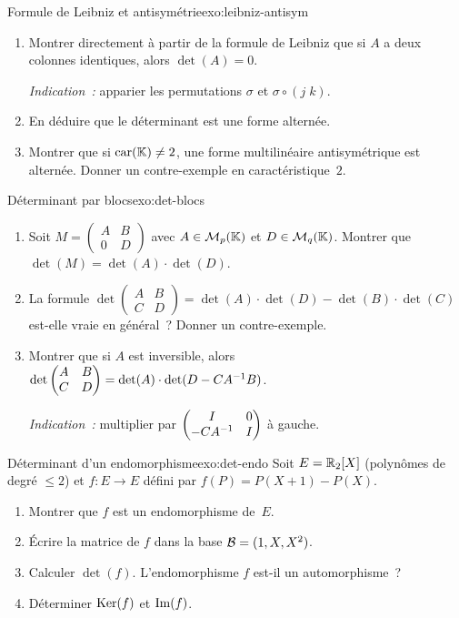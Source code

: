 \begin{exercise}{\challenging{} Formule de Leibniz et antisymétrie}{exo:leibniz-antisym}
  \begin{enumerate}[label=(\alph*)]
    \item Montrer directement à partir de la formule de Leibniz que si
      $A$ a deux colonnes identiques, alors $\det(A)=0$.

      \emph{Indication~:} apparier les permutations $\sigma$ et
      $\sigma\circ(j\;k)$.
    \item En déduire que le déterminant est une forme alternée.
    \item Montrer que si $\operatorname{car}({\mathbb{K}})\neq 2$, une forme multilinéaire
      antisymétrique est alternée. Donner un contre-exemple en
      caractéristique~$2$.
  \end{enumerate}
\end{exercise}

\begin{exercise}{\challenging{} Déterminant par blocs}{exo:det-blocs}
  \begin{enumerate}[label=(\alph*)]
    \item Soit $M=\begin{pmatrix}A&B\\0&D\end{pmatrix}$ avec
      $A\in\mathcal{M}_p({\mathbb{K}})$ et $D\in\mathcal{M}_q({\mathbb{K}})$. Montrer que
      $\det(M)=\det(A)\cdot\det(D)$.
    \item La formule $\det\begin{pmatrix}A&B\\C&D\end{pmatrix}
      =\det(A)\cdot\det(D)-\det(B)\cdot\det(C)$ est-elle vraie en
      général~? Donner un contre-exemple.
    \item Montrer que si $A$ est inversible, alors
      $\det\begin{pmatrix}A&B\\C&D\end{pmatrix}
      =\det(A)\cdot\det(D-C{A}^{-1}B)$.

      \emph{Indication~:} multiplier par
      $\begin{pmatrix}I&0\\-C{A}^{-1}&I\end{pmatrix}$ à gauche.
  \end{enumerate}
\end{exercise}

\begin{exercise}{\challenging{} Déterminant d'un endomorphisme}{exo:det-endo}
  Soit $E={\mathbb{R}}_2[X]$ (polynômes de degré $\leq 2$) et $f\colon E\to E$
  défini par $f(P)=P(X+1)-P(X)$.
  \begin{enumerate}[label=(\alph*)]
    \item Montrer que $f$ est un endomorphisme de~$E$.
    \item Écrire la matrice de $f$ dans la base ${\mathcal{B}}=(1,X,X^2)$.
    \item Calculer $\det(f)$. L'endomorphisme $f$ est-il un
      automorphisme~?
    \item Déterminer $\operatorname{Ker}(f)$ et $\operatorname{Im}(f)$.
  \end{enumerate}
\end{exercise}

